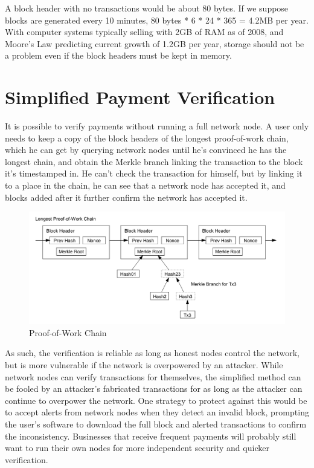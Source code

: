 A block header with no transactions would be about 80 bytes. If we suppose blocks are generated every 10 minutes, 80 bytes * 6 * 24 * 365 = 4.2MB per year. With computer systems typically selling with 2GB of RAM as of 2008, and Moore's Law predicting current growth of 1.2GB per year, storage should not be a problem even if the block headers must be kept in memory.

\section{Simplified Payment Verification}

It is possible to verify payments without running a full network node. A user only needs to keep a copy of the block headers of the longest proof-of-work chain, which he can get by querying network nodes until he's convinced he has the longest chain, and obtain the Merkle branch linking the transaction to the block it's timestamped in. He can't check the transaction for himself, but by linking it to a place in the chain, he can see that a network node has accepted it, and blocks added after it further confirm the network has accepted it.

\begin{figure}[ht!]
\centering
\includegraphics[trim = 0mm 0mm 0mm 0mm, width=120mm]{images/proof_of_work}
\caption{Proof-of-Work Chain}
\end{figure}

As such, the verification is reliable as long as honest nodes control the network, but is more vulnerable if the network is overpowered by an attacker. While network nodes can verify transactions for themselves, the simplified method can be fooled by an attacker's fabricated transactions for as long as the attacker can continue to overpower the network. One strategy to protect against this would be to accept alerts from network nodes when they detect an invalid block, prompting the user's software to download the full block and alerted transactions to confirm the inconsistency. Businesses that receive frequent payments will probably still want to run their own nodes for more independent security and quicker verification.

